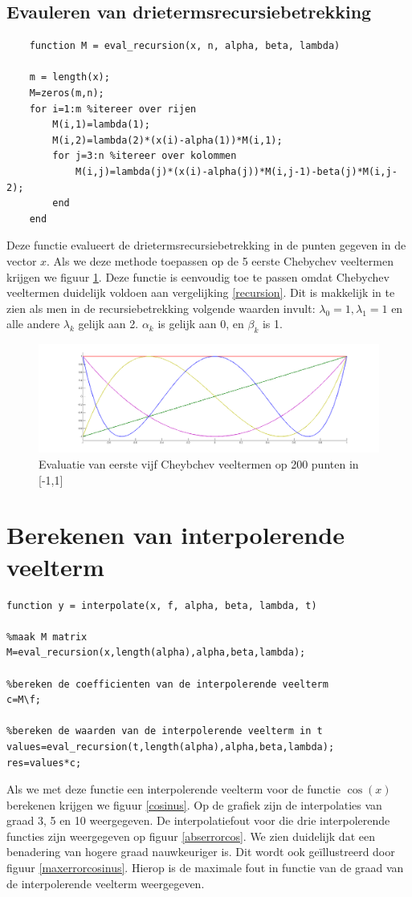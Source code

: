 \documentclass[a4paper, 12pt, titlepage]{report}
\begin{document}
\subsection{Evauleren van drietermsrecursiebetrekking}
\begin{lstlisting}
	function M = eval_recursion(x, n, alpha, beta, lambda)
	
	m = length(x);
	M=zeros(m,n);
	for i=1:m %itereer over rijen
	    M(i,1)=lambda(1);
	    M(i,2)=lambda(2)*(x(i)-alpha(1))*M(i,1);
	    for j=3:n %itereer over kolommen
	        M(i,j)=lambda(j)*(x(i)-alpha(j))*M(i,j-1)-beta(j)*M(i,j-2);
	    end
	end
\end{lstlisting}
Deze functie evalueert de drietermsrecursiebetrekking in de punten gegeven in de vector $x$. Als we deze methode toepassen op de 5 eerste Chebychev veeltermen krijgen we figuur \ref{chebychev}. Deze functie is eenvoudig toe te passen omdat Chebychev veeltermen duidelijk voldoen aan vergelijking \eqref{recursion}. Dit is makkelijk in te zien als men in de recursiebetrekking volgende waarden invult: $\lambda_0=1, \lambda_1=1$ en alle andere $\lambda_k$ gelijk aan 2. $\alpha_k$ is gelijk aan 0, en $\beta_k$ is 1. \\

\begin{figure}[htb]
	\centering
	\includegraphics[width=\textwidth]{chebychev.png}
	\caption{Evaluatie van eerste vijf Cheybchev veeltermen op 200 punten in [-1,1]}
	\label{chebychev}
\end{figure}

\section{Berekenen van interpolerende veelterm}
\begin{lstlisting}
function y = interpolate(x, f, alpha, beta, lambda, t)

%maak M matrix
M=eval_recursion(x,length(alpha),alpha,beta,lambda);

%bereken de coefficienten van de interpolerende veelterm
c=M\f;

%bereken de waarden van de interpolerende veelterm in t
values=eval_recursion(t,length(alpha),alpha,beta,lambda);
res=values*c;
\end{lstlisting}
Als we met deze functie een interpolerende veelterm voor de functie $\cos(x)$ berekenen krijgen we figuur \ref{cosinus}. Op de grafiek zijn de interpolaties van graad 3, 5 en 10 weergegeven. De interpolatiefout voor die drie interpolerende functies zijn weergegeven op figuur \ref{abserrorcos}. We zien duidelijk dat een benadering van hogere graad nauwkeuriger is. Dit wordt ook ge\"illustreerd door figuur \ref{maxerrorcosinus}. Hierop is de maximale fout in functie van de graad van de interpolerende veelterm weergegeven. \\
\end{document}
